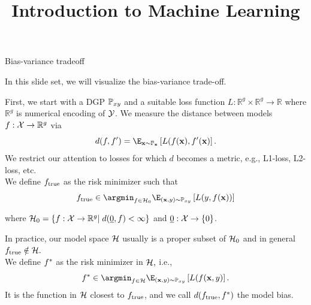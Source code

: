 \documentclass[11pt,compress,t,notes=noshow, xcolor=table]{beamer}
\title{Introduction to Machine Learning}
\begin{document}



\begin{vbframe}{Bias-variance tradeoff}

In this slide set, we will visualize the bias-variance trade-off. \\
\lz 

First, we start with a DGP $\mathbb{P}_{xy}$ and a suitable loss function $L:\mathbb{R}^g\times\mathbb{R}^g\rightarrow\mathbb{R}$ where $\mathbb{R}^g$ is numerical encoding of $\mathcal{Y}$. We measure the distance between models $f:\mathcal{X}\rightarrow\mathbb{R}^g$ via $$d(f, f^\prime) = \E_{\xv\sim\mathbb{P}_{\xv}}\left[L(f(\xv), f^\prime(\xv)\right].$$
We restrict our attention to losses for which $d$ becomes a metric, e.g., L1-loss, L2-loss, etc. \\
\lz
We define $f_{\text{true}}$ as the risk minimizer such that $$\ftrue \in \argmin_{f \in \Hspace_0} \E_{\xy \sim \Pxy}\left[L(y, f(\xv))\right]$$

where $\mathcal{H}_0 = \left\{f:\mathcal{X}\rightarrow\mathbb{R}^g\vert\; d(\underline{0}, f) < \infty \right\}$ and $\underline{0}:\mathcal{X}\rightarrow\{0\}$.

\framebreak

In practice, our model space $\mathcal{H}$ usually is a proper subset of $\mathcal{H}_0$ and in general $f_{\text{true}} \notin \mathcal{H}.$\\
We define $f^{\ast}$ as the risk minimizer in $\mathcal{H},$ i.e.,
$$\fbayes \in \argmin_{f \in \Hspace} \E_{\xy \sim \Pxy}\left[L(f(\xv, y)\right].$$
It is the function in $\mathcal{H}$ closest to $f_{\text{true}}$, and we call $d(f_{\text{true}}, f^{\ast})$ the model bias.


\end{vbframe}
\end{document}
